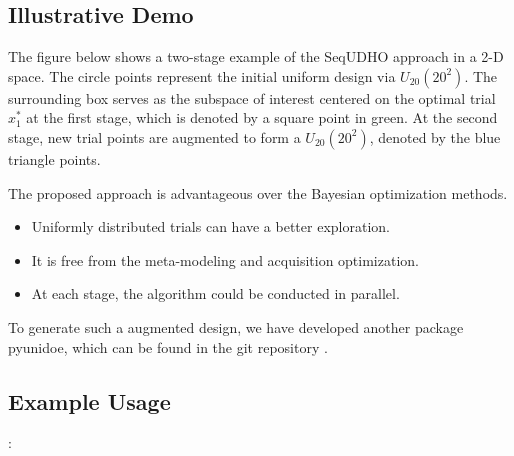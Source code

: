 \documentclass[letterpaper,10pt,english]{sphinxmanual}
\begin{document}
\subsection{Illustrative Demo}
\label{\detokenize{pysequd:illustrative-demo}}
The figure below shows a two-stage example of the SeqUDHO approach in a 2-D space. The circle points represent the initial uniform design via \(U_{20}(20^{2})\). The surrounding box serves as the subspace of interest centered on the optimal trial \(x^{*}_{1}\) at the first stage, which is denoted by a square point in green. At the second stage, new trial points are augmented to form a \(U_{20}(20^{2})\), denoted by the blue triangle points.


The proposed approach is advantageous over the Bayesian optimization methods.
\begin{itemize}
\item {} 
Uniformly distributed trials can have a better exploration.

\item {} 
It is free from the meta-modeling and acquisition optimization.

\item {} 
At each stage, the algorithm could be conducted in parallel.

\end{itemize}

To generate such a augmented design, we have developed another package pyunidoe, which can be found in the git repository .


\subsection{Example Usage}
\label{\detokenize{pysequd:example-usage}}
:
\end{document}
